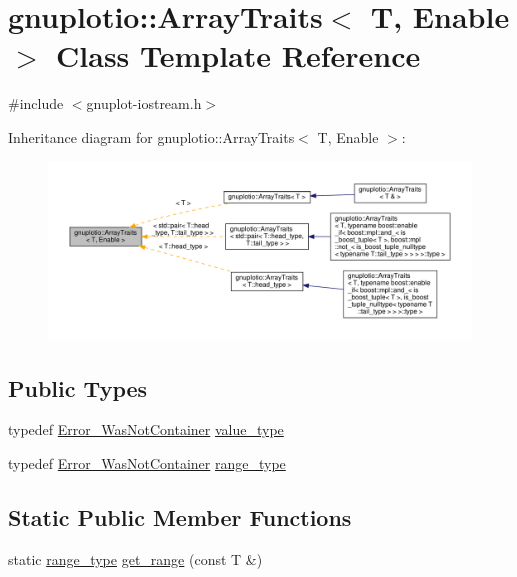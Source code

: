 \hypertarget{classgnuplotio_1_1_array_traits}{}\section{gnuplotio\+:\+:Array\+Traits$<$ T, Enable $>$ Class Template Reference}
\label{classgnuplotio_1_1_array_traits}


{\ttfamily \#include $<$gnuplot-\/iostream.\+h$>$}



Inheritance diagram for gnuplotio\+:\+:Array\+Traits$<$ T, Enable $>$\+:
\nopagebreak
\begin{figure}[H]
\begin{center}
\leavevmode
\includegraphics[width=350pt]{classgnuplotio_1_1_array_traits__inherit__graph}
\end{center}
\end{figure}
\subsection*{Public Types}
\begin{DoxyCompactItemize}
\item 
typedef \hyperlink{structgnuplotio_1_1_error___was_not_container}{Error\+\_\+\+Was\+Not\+Container} \hyperlink{classgnuplotio_1_1_array_traits_a3bcae12a7bf42af90f4946acc66f27e0}{value\+\_\+type}
\item 
typedef \hyperlink{structgnuplotio_1_1_error___was_not_container}{Error\+\_\+\+Was\+Not\+Container} \hyperlink{classgnuplotio_1_1_array_traits_ae53464a5175c03deec403392b8dcb3c5}{range\+\_\+type}
\end{DoxyCompactItemize}
\subsection*{Static Public Member Functions}
\begin{DoxyCompactItemize}
\item 
static \hyperlink{classgnuplotio_1_1_array_traits_ae53464a5175c03deec403392b8dcb3c5}{range\+\_\+type} \hyperlink{classgnuplotio_1_1_array_traits_aee31432f330f9f9e4f5af628641181f7}{get\+\_\+range} (const T \&)
\end{DoxyCompactItemize}
